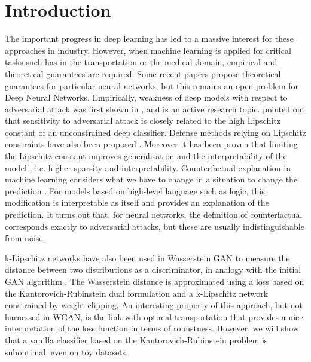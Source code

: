 \documentclass{article}
\begin{document}
\section{Introduction}
\label{sec:intro}

The important progress in deep learning has led to a massive interest for these approaches in industry. However, when machine learning is applied for critical tasks such has in the transportation or the medical domain, empirical and theoretical guarantees are required. Some recent papers \cite{Ducoffe20} propose theoretical guarantees for particular neural networks, but this remains an open problem for Deep Neural Networks.
Empirically, weakness of deep models with respect to adversarial attack was first shown in \cite{szegedy2013}, and is an active research topic. \cite{szegedy2013} pointed out that sensitivity to adversarial attack is closely related to the high Lipschitz constant of an unconstrained deep classifier. Defense methods relying on Lipschitz constraints have also been proposed \cite{cisse_parseval_2017,hein_formal_2017,ono_lightweight_2018,qian_l2-nonexpansive_2019}. 
Moreover it has been proven that limiting the Lipschitz constant improves generalisation \cite{Sokolic_2017} and the interpretability of the model \cite{tsipras2018robustness}, i.e. higher sparsity and interpretability. Counterfactual explanation in machine learning considers what we have to change in a situation to change the prediction \cite{DBLP:journals/corr/abs-1711-00399}. For models based on high-level language such as logic, this modification is interpretable as itself and provides an explanation of the prediction. It turns out that, for neural networks, the definition of counterfactual corresponds exactly to adversarial attacks, but these are usually indistinguishable from noise.

k-Lipschitz networks have also been used in Wasserstein GAN \cite{Arjovsky2017} to measure the distance between two distributions as a discriminator, in analogy with the initial GAN algorithm \cite{Goodfellow2014}. The Wasserstein distance is approximated using a loss based on the Kantorovich-Rubinstein dual formulation and a k-Lipschitz network constrained by weight clipping. An interesting property of this approach, but not harnessed in WGAN,  is the link with optimal transportation that provides a nice interpretation of the loss function in terms of robustness.
However, we will show that a vanilla classifier based on the Kantorovich-Rubinstein problem is suboptimal, even on toy datasets. 
\end{document}
